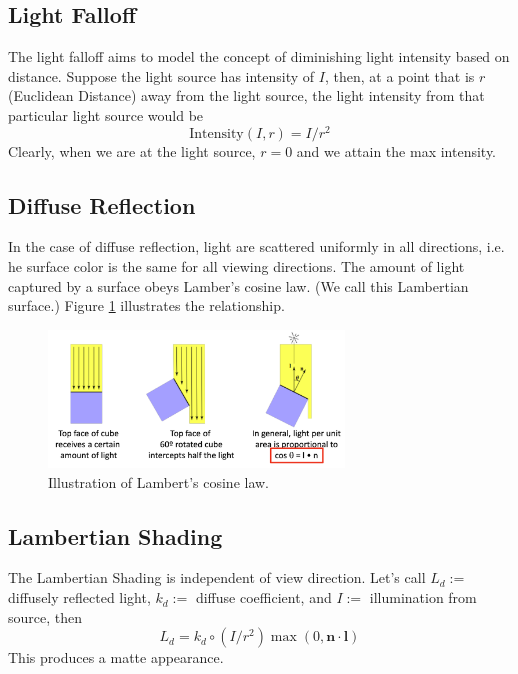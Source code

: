 \documentclass[11pt]{article}
\begin{document}
\subsection{Light Falloff}
The light falloff aims to model the concept of diminishing light intensity based on distance. Suppose the light source has intensity of $I$, then, at a point that is $r$ (Euclidean Distance) away from the light source, the light intensity from that particular light source would be
\begin{equation}
	\text{Intensity}(I, r) = I / r^2
\end{equation}
Clearly, when we are at the light source, $r = 0$ and we attain the max intensity. 

\subsection{Diffuse Reflection}
In the case of diffuse reflection, light are scattered uniformly in all directions, i.e. he surface color is the same for all viewing directions. The amount of light captured by a surface obeys Lamber's cosine law. (We call this Lambertian surface.) Figure \ref{lambert} illustrates the relationship. 

\begin{figure}
	\centering \includegraphics[width=0.7\textwidth]{figs/lambert}
	\caption{\label{lambert} Illustration of Lambert's cosine law. }
\end{figure}

\subsection{Lambertian Shading} 
The Lambertian Shading is independent of view direction. Let's call $L_d:=$ diffusely reflected light, $k_d:=$ diffuse coefficient, and $I:=$ illumination from source, then 
\begin{equation}
	L_{d}=k_{d}\circ \left(I / r^{2}\right) \max (0, \mathbf{n} \cdot \mathbf{l})
\end{equation}
This produces a matte appearance. 
\end{document}
